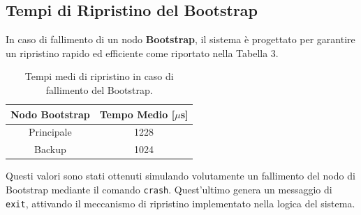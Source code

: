 \documentclass{article}
\begin{document}
\subsection{Tempi di Ripristino del Bootstrap}
In caso di fallimento di un nodo \textbf{Bootstrap}, il sistema è progettato per garantire un ripristino rapido ed efficiente come riportato nella Tabella 3.
\begin{table}[!htbp] 
    \centering 
    \begin{tabular}{|c|c|} 
        \hline 
        Nodo Bootstrap & Tempo Medio [$\mu$s] \\ 
        \hline 
        Principale & 1228 \\ 
        \hline 
        Backup & 1024 \\ 
        \hline 
    \end{tabular} 
    \caption{Tempi medi di ripristino in caso di fallimento del Bootstrap.} \label{tab:Bootstrap} 
\end{table} 
Questi valori sono stati ottenuti simulando volutamente un fallimento del nodo di Bootstrap mediante il comando \texttt{crash}. Quest'ultimo genera un messaggio di \texttt{exit}, attivando il meccanismo di ripristino implementato nella logica del sistema.
\printbibliography
\end{document}
